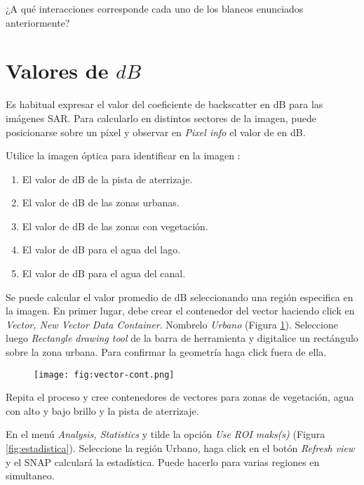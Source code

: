 \begin{que}
    ¿A qué interacciones corresponde cada uno de los blancos enunciados anteriormente?
\end{que}

\section{Valores de $dB$}

Es habitual expresar el valor del coeficiente de backscatter en dB para las imágenes SAR. Para calcularlo en distintos sectores de la imagen, puede posicionarse sobre un píxel y observar en \emph{Pixel info} el valor de  en dB.


Utilice la imagen óptica para identificar en la imagen :

 \begin{enumerate}
     \item El valor de dB de la pista de aterrizaje.
     \item El valor de dB de las zonas urbanas.
     \item El valor de dB de las zonas con vegetación.
     \item El valor de dB para el agua del lago.
     \item El valor de dB para el agua del canal.
 \end{enumerate}

Se puede calcular el valor promedio de dB seleccionando una región especifica en la imagen. En primer lugar, debe crear el contenedor del vector haciendo click en \emph{Vector, New Vector Data Container}. Nombrelo \emph{Urbano} (Figura \ref{fig:vector-cont}). Seleccione luego  \emph{Rectangle drawing tool} de la barra de herramienta y digitalice un rectángulo sobre la zona urbana. Para confirmar la geometría haga click fuera de ella.

\begin{figure}[h!]
    \centering
    \texttt{[image: fig:vector-cont.png]}
    \caption{}
    \label{fig:vector-cont}
\end{figure}

Repita el proceso y cree contenedores de vectores para zonas de vegetación, agua con alto y bajo brillo y la pista de aterrizaje.

En el menú \emph{Analysis, Statistics} y tilde la opción \emph{Use ROI maks(s)} (Figura \ref{fig:estadistica}). Seleccione la región Urbano, haga click en el botón \emph{Refresh view} y el SNAP calculará la estadística. Puede hacerlo para varias regiones en simultaneo.


